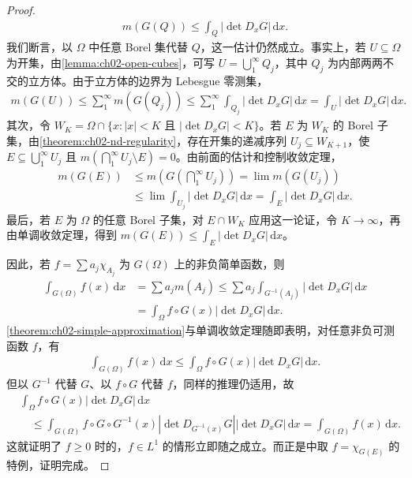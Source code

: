 \documentclass[../../main.tex]{subfiles}%
\begin{document}
\begin{proof}
\begin{align*}
m(G(Q))\le\int_Q|\det D_xG|\,\mathrm{d}x.
\end{align*}
我们断言，以 $\Omega$ 中任意 Borel 集代替 $Q$，这一估计仍然成立。事实上，若 $U\subseteq\Omega$ 为开集，由\cref{lemma:ch02-open-cubes}，可写 $U=\bigcup_1^\infty Q_j$，其中 $Q_j$ 为内部两两不交的立方体。由于立方体的边界为 Lebesgue 零测集，
\begin{align*}
m(G(U))\le\sum_1^\infty m(G(Q_j))
\le\sum_1^\infty\int_{Q_j}|\det D_xG|\,\mathrm{d}x
=\int_U|\det D_xG|\,\mathrm{d}x.
\end{align*}
其次，令 $W_K=\Omega\cap\{x:|x|<K\text{ 且 }|\det D_xG|<K\}$。若 $E$ 为 $W_K$ 的 Borel 子集，由\cref{theorem:ch02-nd-regularity}，存在开集的递减序列 $U_j\subseteq W_{K+1}$，使 $E\subseteq\bigcup_1^\infty U_j$ 且 $m(\bigcap_1^\infty U_j\setminus E)=0$。由前面的估计和控制收敛定理，
\begin{align*}
m(G(E))&\le m\left(G\left(\bigcap_1^\infty U_j\right)\right)=\lim m(G(U_j))\\
&\le\lim\int_{U_j}|\det D_xG|\,\mathrm{d}x=\int_E|\det D_xG|\,\mathrm{d}x.
\end{align*}
最后，若 $E$ 为 $\Omega$ 的任意 Borel 子集，对 $E\cap W_K$ 应用这一论证，令 $K\to\infty$，再由单调收敛定理，得到 $m(G(E))\le\int_E|\det D_xG|\,\mathrm{d}x$。

因此，若 $f=\sum a_j\chi_{A_j}$ 为 $G(\Omega)$ 上的非负简单函数，则
\begin{align*}
\int_{G(\Omega)}f(x)\,\mathrm{d}x
&=\sum a_jm(A_j)\le\sum a_j\int_{G^{-1}(A_j)}|\det D_xG|\,\mathrm{d}x\\
&=\int_\Omega f\circ G(x)|\det D_xG|\,\mathrm{d}x.
\end{align*}
\cref{theorem:ch02-simple-approximation}与单调收敛定理随即表明，对任意非负可测函数 $f$，有
\begin{align*}
\int_{G(\Omega)}f(x)\,\mathrm{d}x\le\int_\Omega f\circ G(x)|\det D_xG|\,\mathrm{d}x.
\end{align*}
但以 $G^{-1}$ 代替 $G$、以 $f\circ G$ 代替 $f$，同样的推理仍适用，故
\begin{align*}
&\int_\Omega f\circ G(x)|\det D_xG|\,\mathrm{d}x\\
&\quad\le\int_{G(\Omega)}f\circ G\circ G^{-1}(x)|\det D_{G^{-1}(x)}G||\det D_xG|\,\mathrm{d}x
=\int_{G(\Omega)}f(x)\,\mathrm{d}x.
\end{align*}
这就证明了 $f\ge0$ 时的，$f\in L^1$ 的情形立即随之成立。而正是中取 $f=\chi_{G(E)}$ 的特例，证明完成。
\end{proof}
\end{document}
